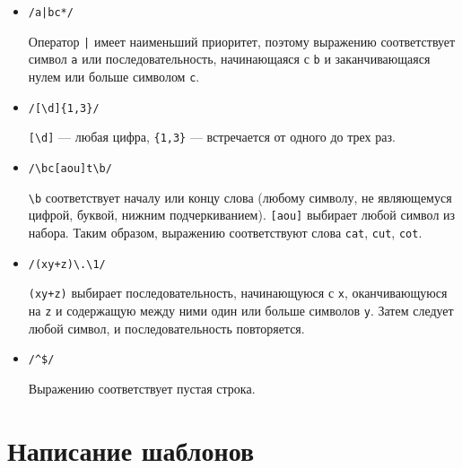 \documentclass[listings]{labreport}
\begin{document}
\begin{itemize}
\item \verb=/a|bc*/=

Оператор \verb=|= имеет наименьший приоритет, поэтому выражению соответствует
символ \texttt{a} или последовательность, начинающаяся с \texttt{b} и заканчивающаяся
нулем или больше символом \texttt{c}.

\item \verb=/[\d]{1,3}/=

\verb|[\d]| — любая цифра, \verb|{1,3}| — встречается от одного до трех раз.

\item \verb=/\bc[aou]t\b/=

\verb|\b| соответствует началу или концу слова (любому символу, не являющемуся
цифрой, буквой, нижним подчеркиванием). \verb|[aou]| выбирает любой символ из набора.
Таким образом, выражению соответствуют слова \texttt{cat}, \texttt{cut}, \texttt{cot}.

\item \verb=/(xy+z)\.\1/=

\verb|(xy+z)| выбирает последовательность, начинающуюся с \texttt{x}, оканчивающуюся
на \texttt{z} и содержащую между ними один или больше символов \texttt{y}. Затем
следует любой символ, и последовательность повторяется.

\item \verb=/^$/=

Выражению соответствует пустая строка.

\end{itemize}

\section*{Написание шаблонов}
\end{document}
